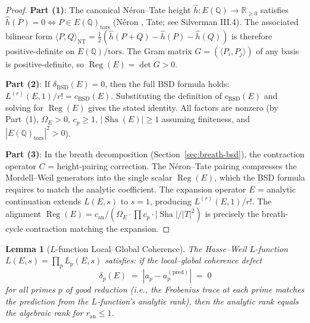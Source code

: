 \documentclass[11pt]{article}
\newtheorem{lemma}[theorem]{Lemma}
\DeclareMathOperator{\Reg}{Reg}
\DeclareMathOperator{\Sha}{Sha}
\begin{document}
\begin{proof}
\textbf{Part (1)}: The canonical N\'eron--Tate height
$\hat{h} \colon E(\mathbb{Q}) \to \mathbb{R}_{\geq 0}$ satisfies
$\hat{h}(P) = 0 \Leftrightarrow P \in E(\mathbb{Q})_{\mathrm{tors}}$
(N\'eron \cite{Neron}, Tate; see Silverman \cite{SilvAdv} III.4).
The associated bilinear form $\langle P, Q \rangle_{\mathrm{NT}} =
\tfrac{1}{2}(\hat{h}(P+Q) - \hat{h}(P) - \hat{h}(Q))$ is therefore
positive-definite on $E(\mathbb{Q})/\mathrm{tors}$.  The Gram matrix
$G = (\langle P_i, P_j \rangle)$ of any basis is positive-definite, so
$\Reg(E) = \det G > 0$.

\textbf{Part (2)}: If $\delta_{\mathrm{BSD}}(E) = 0$, then the full BSD
formula holds: $L^{(r)}(E,1)/r! = c_{\mathrm{BSD}}(E)$.  Substituting the
definition of $c_{\mathrm{BSD}}(E)$ and solving for $\Reg(E)$ gives the
stated identity.  All factors are nonzero (by Part~(1), $\Omega_E > 0$,
$c_p \geq 1$, $|\Sha(E)| \geq 1$ assuming finiteness, and
$|E(\mathbb{Q})_{\mathrm{tors}}|^2 > 0$).

\textbf{Part (3)}: In the breath decomposition (Section~\ref{sec:breath-bsd}),
the contraction operator $C$ = height-pairing correction.  The N\'eron--Tate
pairing compresses the Mordell--Weil generators into the single scalar
$\Reg(E)$, which the BSD formula requires to match the analytic coefficient.
The expansion operator $E$ = analytic continuation extends $L(E,s)$ to $s=1$,
producing $L^{(r)}(E,1)/r!$.  The alignment $\Reg(E) = c_{\mathrm{an}} /
(\Omega_E \cdot \prod c_p \cdot |\Sha|/|T|^2)$ is precisely the
breath-cycle contraction matching the expansion.
\end{proof}

\begin{lemma}[$L$-function Local--Global Coherence]
\label{lem:L-local-global}
The Hasse--Weil $L$-function $L(E,s) = \prod_p L_p(E,s)$ satisfies: if the
local--global coherence defect
\[
  \delta_p(E) \;=\; |a_p - a_p^{(\mathrm{pred})}| \;=\; 0
\]
for all primes $p$ of good reduction (i.e., the Frobenius trace at each prime
matches the prediction from the $L$-function's analytic rank), then the analytic
rank equals the algebraic rank for $r_{\mathrm{an}} \leq 1$.
\end{lemma}
\end{document}
